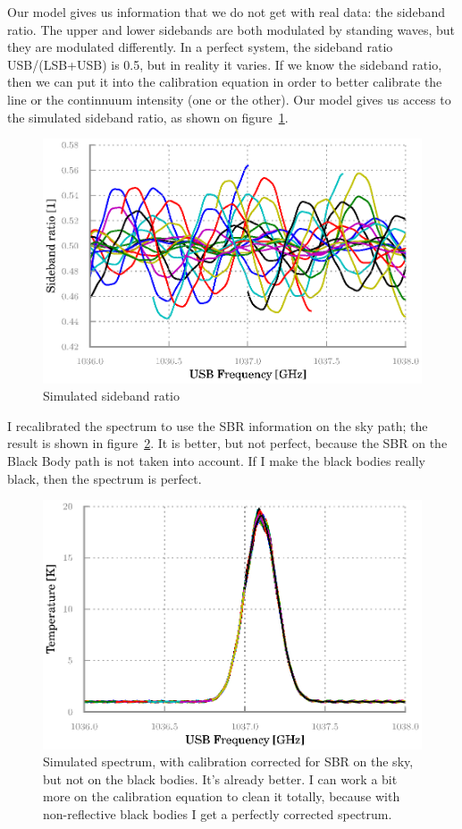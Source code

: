 \documentclass[a4paper,11pt]{article}
\begin{document}
Our model gives us information that we do not get with real data: the sideband ratio.
The upper and lower sidebands are both modulated by standing waves, but they are modulated differently.
In a perfect system, the sideband ratio USB/(LSB+USB) is 0.5, but in reality it varies.
If we know the sideband ratio, then we can put it into the calibration equation in order to better calibrate the line or the continnuum intensity (one or the other).
Our model gives us access to the simulated sideband ratio, as shown on figure~\ref{fig:sbr}.
\begin{figure}
    \centering
    \includegraphics{sbr}
    \caption{\label{fig:sbr}Simulated sideband ratio}
\end{figure}

I recalibrated the spectrum to use the SBR information on the sky path; the result is shown in figure~\ref{fig:simulated_spectrum_corrected}.
It is better, but not perfect, because the SBR on the Black Body path is not taken into account.  If I make the black bodies really black, then the spectrum is perfect.
\begin{figure}
    \centering
    \includegraphics{bb-on_corrected-2}
    \caption{\label{fig:simulated_spectrum_corrected} Simulated spectrum, with calibration corrected for SBR on the sky, but not on the black bodies.  It's already better.  I can work a bit more on the calibration equation to clean it totally, because with non-reflective black bodies I get a perfectly corrected spectrum.}
\end{figure}
\end{document}
